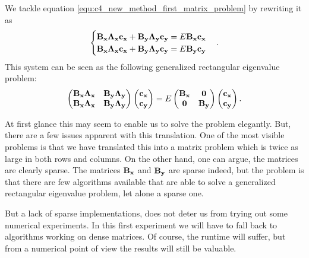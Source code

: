 We tackle equation \eqref{equ:c4_new_method_first_matrix_problem} by rewriting it as
$$
    \begin{cases}
        \vb{B_x} \vb{\Lambda_x}\vb{c_x} + \vb{B_y} \vb{\Lambda_y}\vb{c_y} = E \vb{B_x} \vb{c_x} \\
        \vb{B_x} \vb{\Lambda_x}\vb{c_x} + \vb{B_y} \vb{\Lambda_y}\vb{c_y} = E \vb{B_y} \vb{c_y} \\
    \end{cases}\text{.}
$$
This system can be seen as the following generalized rectangular eigenvalue problem:
\begin{equation}\label{equ:c4_new_method_alternative_system}
    \begin{pmatrix}
        \vb{B_x} \vb{\Lambda_x} & \vb{B_y} \vb{\Lambda_y} \\
        \vb{B_x} \vb{\Lambda_x} & \vb{B_y} \vb{\Lambda_y}
    \end{pmatrix} \begin{pmatrix}
        \vb{c_x} \\ \vb{c_y}
    \end{pmatrix} = E \begin{pmatrix}
        \vb{B_x} & \vb{0} \\ \vb{0} & \vb{B_y}
    \end{pmatrix} \begin{pmatrix}
        \vb{c_x} \\ \vb{c_y}
    \end{pmatrix}\text{.}
\end{equation}

At first glance this may seem to enable us to solve the problem elegantly. But, there are a few issues apparent with this translation. One of the most visible problems is that we have translated this into a matrix problem which is twice as large in both rows and columns. On the other hand, one can argue, the matrices are clearly sparse. The matrices $\vb{B_x}$ and $\vb{B_y}$ are sparse indeed, but the problem is that there are few algorithms available that are able to solve a generalized rectangular eigenvalue problem, let alone a sparse one.

But a lack of sparse implementations, does not deter us from trying out some numerical experiments. In this first experiment we will have to fall back to algorithms working on dense matrices. Of course, the runtime will suffer, but from a numerical point of view the results will still be valuable.

